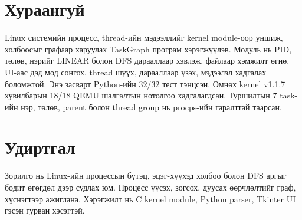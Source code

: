 
\usepackage{colortbl}

\setlength{\emergencystretch}{8em}

\tableofcontents
\clearpage
{}
\renewcommand{\arraystretch}{1.25}
\setlength{\extrarowheight}{2pt}
\setlength{\tabcolsep}{6pt}
\setlength{\intextsep}{8pt}

\section*{Хураангуй}
Linux системийн процесс, thread-ийн мэдээллийг kernel module-оор уншиж, холбоосыг графаар харуулах TaskGraph програм хэрэгжүүлэв. Модуль нь PID, төлөв, нэрийг LINEAR болон DFS дарааллаар хэвлэж,  файлаар хэмжилт өгнө. UI-аас дэд мод сонгох, thread шүүх, дарааллаар үзэх, мэдээлэл хадгалах боломжтой. Энэ засварт Python-ийн 32/32 тест тэнцсэн. Өмнөх kernel v1.1.7 хувилбарын 18/18 QEMU шалгалтын нотолгоо хадгалагдсан. Туршилтын 7 task-ийн нэр, төлөв, parent болон thread group нь procps-ийн гаралттай таарсан.

\section{Удиртгал}
Зорилго нь Linux-ийн процессын бүтэц, эцэг-хүүхэд холбоо болон DFS аргыг бодит өгөгдөл дээр судлах юм. Процесс үүсэх, зогсох, дуусах өөрчлөлтийг граф, хүснэгтээр ажиглана. Хэрэгжилт нь C kernel module, Python parser, Tkinter UI гэсэн гурван хэсэгтэй.


